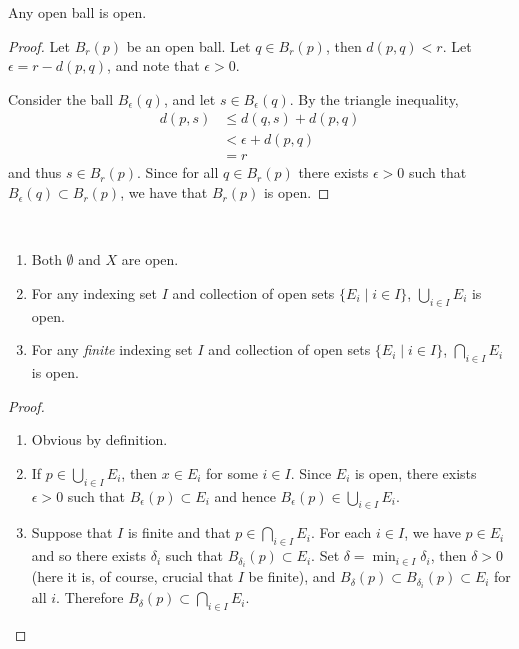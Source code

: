 \begin{proposition}
Any open ball is open.
\end{proposition}

\begin{proof}
Let $B_r(p)$ be an open ball. Let $q\in B_r(p)$, then $d(p,q)<r$. Let $\epsilon=r-d(p,q)$, and note that $\epsilon>0$.

Consider the ball $B_\epsilon(q)$, and let $s\in B_\epsilon(q)$. By the triangle inequality,
\begin{align*}
d(p,s)&\le d(q,s)+d(p,q)\\
&<\epsilon+d(p,q)\\
&=r
\end{align*}
and thus $s\in B_r(p)$. Since for all $q\in B_r(p)$ there exists $\epsilon>0$ such that $B_\epsilon(q)\subset B_r(p)$, we have that $B_r(p)$ is open.
\end{proof}

\begin{proposition}\label{prop:open-set-properties} \
\begin{enumerate}[label=(\roman*)]
\item Both $\emptyset$ and $X$ are open.
\item For any indexing set $I$ and collection of open sets $\{E_i\mid i\in I\}$, $\bigcup_{i\in I}E_i$ is open.
\item For any \emph{finite} indexing set $I$ and collection of open sets $\{E_i\mid i\in I\}$, $\bigcap_{i\in I}E_i$ is open.
\end{enumerate}
\end{proposition}

\begin{proof} \
\begin{enumerate}[label=(\roman*)]
\item Obvious by definition.
\item If $p\in\bigcup_{i\in I}E_i$, then $x\in E_i$ for some $i\in I$. Since $E_i$ is open, there exists $\epsilon>0$ such that $B_\epsilon(p)\subset E_i$ and hence $ B_\epsilon(p)\in\bigcup_{i\in I}E_i$.
\item Suppose that $I$ is finite and that $p\in\bigcap_{i\in I}E_i$. For each $i\in I$, we have $p\in E_i$ and so there exists $\delta_i$ such that $B_{\delta_i}(p)\subset E_i$. Set $\delta=\min_{i\in I}\delta_i$, then $\delta>0$ (here it is, of course, crucial that $I$ be finite), and $B_\delta(p)\subset B_{\delta_i}(p)\subset E_i$ for all $i$. Therefore $ B_\delta(p)\subset\bigcap_{i\in I}E_i$.
\end{enumerate}
\end{proof}

